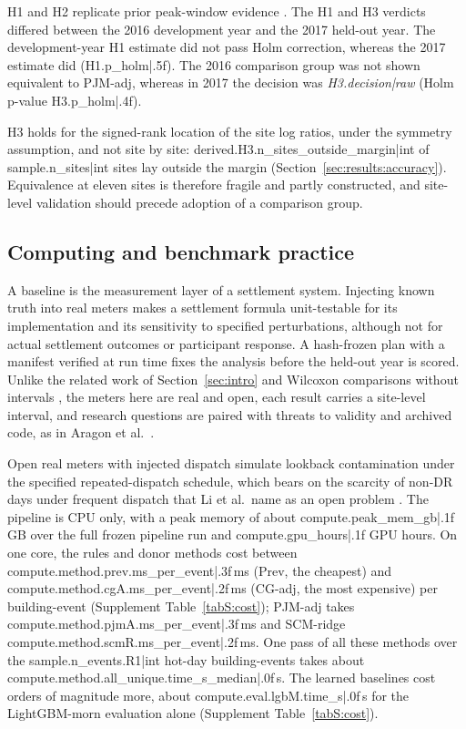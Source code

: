 H1 and H2 replicate prior peak-window evidence \citep{granderson2021,coughlin2009}. The H1 and H3 verdicts differed between the 2016 development year and the 2017 held-out year. The development-year H1 estimate did not pass Holm correction, whereas the 2017 estimate did ({{H1.p_holm|.5f}}). The 2016 comparison group was not shown equivalent to PJM-adj, whereas in 2017 the decision was \emph{{{H3.decision|raw}}} (Holm p-value {{H3.p_holm|.4f}}).

H3 holds for the signed-rank location of the site log ratios, under the symmetry assumption, and not site by site: {{derived.H3.n_sites_outside_margin|int}} of {{sample.n_sites|int}} sites lay outside the margin (Section~\ref{sec:results:accuracy}). Equivalence at eleven sites is therefore fragile and partly constructed, and site-level validation should precede adoption of a comparison group.

\subsection{Computing and benchmark practice}\label{sec:discussion:computing}

A baseline is the measurement layer of a settlement system. Injecting known truth into real meters makes a settlement formula unit-testable for its implementation and its sensitivity to specified perturbations, although not for actual settlement outcomes or participant response. A hash-frozen plan with a manifest verified at run time fixes the analysis before the held-out year is scored. Unlike the related work of Section~\ref{sec:intro} and Wilcoxon comparisons without intervals \citep{jovanovic2025suscom}, the meters here are real and open, each result carries a site-level interval, and research questions are paired with threats to validity and archived code, as in Aragon et al.\ \citep{aragon2025suscom}.

Open real meters with injected dispatch simulate lookback contamination under the specified repeated-dispatch schedule, which bears on the scarcity of non-DR days under frequent dispatch that Li et al.\ name as an open problem \citep{li2026review}. The pipeline is CPU only, with a peak memory of about {{compute.peak_mem_gb|.1f}}\,GB over the full frozen pipeline run and {{compute.gpu_hours|.1f}} GPU hours. On one core, the rules and donor methods cost between {{compute.method.prev.ms_per_event|.3f}}\,ms (Prev, the cheapest) and {{compute.method.cgA.ms_per_event|.2f}}\,ms (CG-adj, the most expensive) per building-event (Supplement Table~\ref{tabS:cost}); PJM-adj takes {{compute.method.pjmA.ms_per_event|.3f}}\,ms and SCM-ridge {{compute.method.scmR.ms_per_event|.2f}}\,ms. One pass of all these methods over the {{sample.n_events.R1|int}} hot-day building-events takes about {{compute.method.all_unique.time_s_median|.0f}}\,s. The learned baselines cost orders of magnitude more, about {{compute.eval.lgbM.time_s|.0f}}\,s for the LightGBM-morn evaluation alone (Supplement Table~\ref{tabS:cost}).

